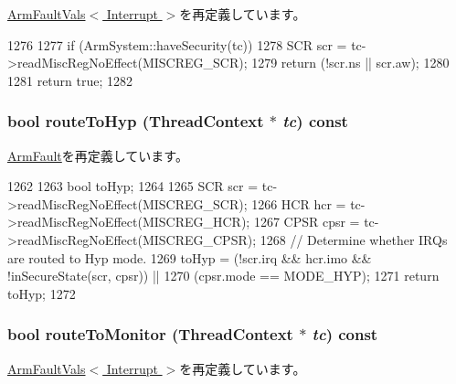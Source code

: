 \hyperlink{classArmISA_1_1ArmFaultVals_a1f1a5b662b9a505415dd5ef1f52892f3}{ArmFaultVals$<$ Interrupt $>$}を再定義しています。


\begin{DoxyCode}
1276 {
1277     if (ArmSystem::haveSecurity(tc)) {
1278         SCR scr = tc->readMiscRegNoEffect(MISCREG_SCR);
1279         return (!scr.ns || scr.aw);
1280     }
1281     return true;
1282 }
\end{DoxyCode}
\hypertarget{classArmISA_1_1Interrupt_a16facd13ba8e6d15d2b865882c379d5f}{
\subsubsection[{routeToHyp}]{\setlength{\rightskip}{0pt plus 5cm}bool routeToHyp ({\bf ThreadContext} $\ast$ {\em tc}) const}}
\label{classArmISA_1_1Interrupt_a16facd13ba8e6d15d2b865882c379d5f}


\hyperlink{classArmISA_1_1ArmFault_a6fa7b734487c2a8da04a28ace414a355}{ArmFault}を再定義しています。


\begin{DoxyCode}
1262 {
1263     bool toHyp;
1264 
1265     SCR  scr  = tc->readMiscRegNoEffect(MISCREG_SCR);
1266     HCR  hcr  = tc->readMiscRegNoEffect(MISCREG_HCR);
1267     CPSR cpsr = tc->readMiscRegNoEffect(MISCREG_CPSR);
1268     // Determine whether IRQs are routed to Hyp mode.
1269     toHyp = (!scr.irq && hcr.imo && !inSecureState(scr, cpsr)) ||
1270             (cpsr.mode == MODE_HYP);
1271     return toHyp;
1272 }
\end{DoxyCode}
\hypertarget{classArmISA_1_1Interrupt_afd7a21fdb010230ad53094254739dde8}{
\subsubsection[{routeToMonitor}]{\setlength{\rightskip}{0pt plus 5cm}bool routeToMonitor ({\bf ThreadContext} $\ast$ {\em tc}) const}}
\label{classArmISA_1_1Interrupt_afd7a21fdb010230ad53094254739dde8}


\hyperlink{classArmISA_1_1ArmFaultVals_a9a0a467b98f43890c1d89d1d59a5923c}{ArmFaultVals$<$ Interrupt $>$}を再定義しています。


